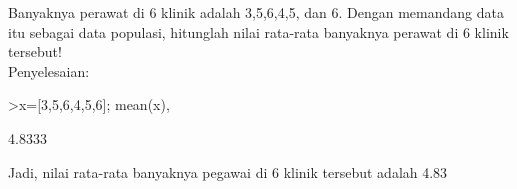 \documentclass[a4paper,10pt]{article}
\begin{document}
\begin{eulernotebook}
\begin{eulercomment}
\begin{eulercomment}
\begin{eulercomment}
\begin{eulercomment}
\begin{eulercomment}
\begin{eulercomment}
\begin{euleroutput}
  [0.44146,  0.60256,  0.80083,  0.62485,  0.53482]
\end{euleroutput}
\begin{eulercomment}
Banyaknya perawat di 6 klinik adalah 3,5,6,4,5, dan 6. Dengan
memandang data itu sebagai data populasi, hitunglah nilai rata-rata
banyaknya perawat di 6 klinik tersebut!\\
Penyelesaian:
\end{eulercomment}
\begin{eulerprompt}
>x=[3,5,6,4,5,6]; mean(x),
\end{eulerprompt}
\begin{euleroutput}
  4.8333
\end{euleroutput}
\begin{eulercomment}
Jadi, nilai rata-rata banyaknya pegawai di 6 klinik tersebut adalah
4.83


\end{eulercomment}
\end{eulercomment}
\end{eulercomment}
\end{eulercomment}
\end{eulercomment}
\end{eulercomment}
\end{eulercomment}
\end{eulernotebook}
\end{document}
